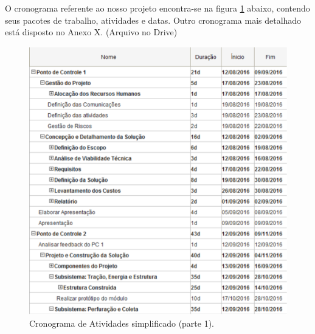       O cronograma referente ao nosso projeto encontra-se na figura \ref{fig:cron_s1}
      abaixo, contendo seus pacotes de trabalho, atividades e datas. Outro
      cronograma mais detalhado está disposto no Anexo X. (Arquivo no Drive)
      
      \begin{figure}[!htbp]
      \begin{center}
      \includegraphics[width=\textwidth]{figuras/cronograma_simples_1.eps}
      \caption{\label{fig:cron_s1}Cronograma de Atividades simplificado (parte 1).}
      \end{center}
      \end{figure}
      
